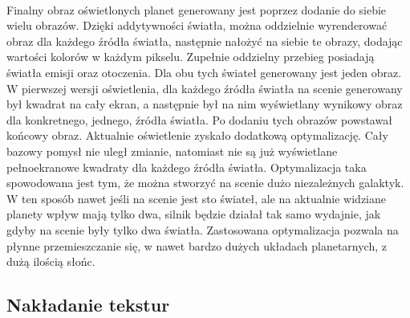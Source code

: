 \paragraph{}

Finalny obraz oświetlonych planet generowany jest poprzez dodanie do siebie wielu obrazów. Dzięki addytywności światła, można oddzielnie wyrenderować obraz dla każdego źródła światła, następnie nałożyć na siebie te obrazy, dodając wartości kolorów w każdym pikselu. Zupełnie oddzielny przebieg posiadają światła emisji oraz otoczenia. Dla obu tych świateł generowany jest jeden obraz. W pierwszej wersji oświetlenia, dla każdego źródła światła na scenie generowany był kwadrat na cały ekran, a następnie był na nim wyświetlany wynikowy obraz dla konkretnego, jednego, źródła światła. Po dodaniu tych obrazów powstawał końcowy obraz. Aktualnie oświetlenie zyskało dodatkową optymalizację. Cały bazowy pomysł nie uległ zmianie, natomiast nie są już wyświetlane pełnoekranowe kwadraty dla każdego źródła światła. Optymalizacja taka spowodowana jest tym, że można stworzyć na scenie dużo niezależnych galaktyk. W ten sposób nawet jeśli na scenie jest sto świateł, ale na aktualnie widziane planety wpływ mają tylko dwa, silnik będzie działał tak samo wydajnie, jak gdyby na scenie były tylko dwa światła. Zastosowana optymalizacja pozwala na płynne przemieszczanie się, w nawet bardzo dużych układach planetarnych, z dużą ilością słońc.

\subsection{Nakładanie tekstur}\label{sub:nakladanie tekstur}
\paragraph{}

